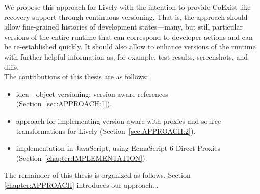 We propose this approach for Lively with the intention to provide CoExist-like recovery support through continuous versioning.
That is, the approach should allow fine-grained histories of development states---many, but still particular versions of the entire runtime that can correspond to developer actions and can be re-established quickly.
It should also allow to enhance versions of the runtime with further helpful information as, for example, test results, screenshots, and diffs.\\

The contributions of this thesis are as follows:
\begin{itemize}
    \item idea - object versioning: version-aware references (Section~\ref{sec:APPROACH:1}).
    \item approach for implementing version-aware with proxies and source transformations for Lively (Section~\ref{sec:APPROACH:2}).
    \item implementation in JavaScript, using EcmaScript 6 Direct Proxies (Section~\ref{chapter:IMPLEMENTATION}).\\
\end{itemize}

The remainder of this thesis is organized as follows. Section \ref{chapter:APPROACH} introduces our approach...\\
